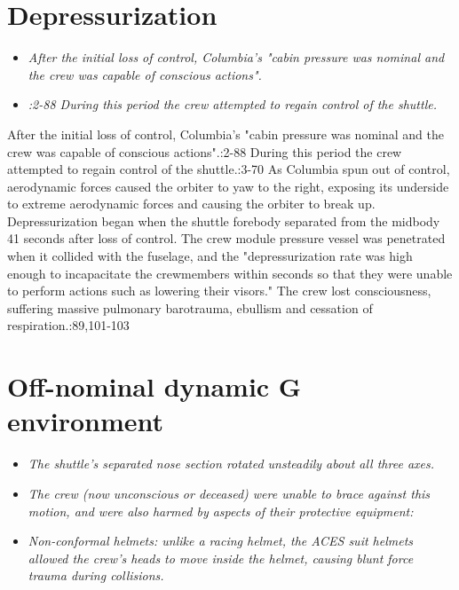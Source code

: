 \section{Depressurization}\label{depressurization}

\begin{itemize}
\item
  \emph{After the initial loss of control, Columbia's "cabin pressure
  was nominal and the crew was capable of conscious actions".}
\item
  \emph{:2-88 During this period the crew attempted to regain control of
  the shuttle.}
\end{itemize}

After the initial loss of control, Columbia's "cabin pressure was
nominal and the crew was capable of conscious actions".:2-88 During this
period the crew attempted to regain control of the shuttle.:3-70 As
Columbia spun out of control, aerodynamic forces caused the orbiter to
yaw to the right, exposing its underside to extreme aerodynamic forces
and causing the orbiter to break up. Depressurization began when the
shuttle forebody separated from the midbody 41 seconds after loss of
control. The crew module pressure vessel was penetrated when it collided
with the fuselage, and the "depressurization rate was high enough to
incapacitate the crewmembers within seconds so that they were unable to
perform actions such as lowering their visors." The crew lost
consciousness, suffering massive pulmonary barotrauma, ebullism and
cessation of respiration.:89,101-103

\section{Off-nominal dynamic G
environment}\label{off-nominal-dynamic-g-environment}

\begin{itemize}
\item
  \emph{The shuttle's separated nose section rotated unsteadily about
  all three axes.}
\item
  \emph{The crew (now unconscious or deceased) were unable to brace
  against this motion, and were also harmed by aspects of their
  protective equipment:}
\item
  \emph{Non-conformal helmets: unlike a racing helmet, the ACES suit
  helmets allowed the crew's heads to move inside the helmet, causing
  blunt force trauma during collisions.}
\end{itemize}

